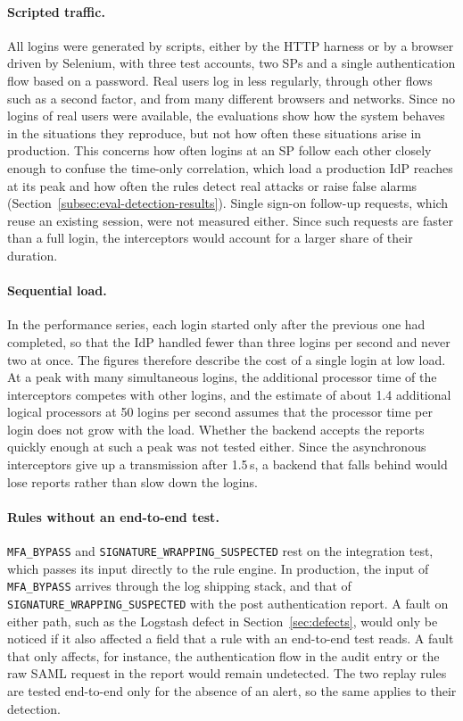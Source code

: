 \documentclass[../main.tex]{subfiles}
\begin{document}
\paragraph{Scripted traffic.}
All logins were generated by scripts, either by the HTTP harness or by a browser driven by Selenium, 
with three test accounts, two SPs and a single authentication flow based on a password. 
Real users log in less regularly, through other flows such as a second factor, and from many 
different browsers and networks. 
Since no logins of real users were available, the evaluations show how the system behaves in the 
situations they reproduce, but not how often these situations arise in production. 
This concerns how often logins at an SP follow each other closely enough to confuse the time-only 
correlation, which load a production IdP reaches at its peak and how often the rules detect real 
attacks or raise false alarms (Section~\ref{subsec:eval-detection-results}). 
Single sign-on follow-up requests, which reuse an existing session, were not measured either. 
Since such requests are faster than a full login, the interceptors would account for a larger share 
of their duration.

\paragraph{Sequential load.}
In the performance series, each login started only after the previous one had completed, so that 
the IdP handled fewer than three logins per second and never two at once. 
The figures therefore describe the cost of a single login at low load. 
At a peak with many simultaneous logins, the additional processor time of the interceptors competes 
with other logins, and the estimate of about 1.4 additional logical processors at 50 logins per second assumes 
that the processor time per login does not grow with the load. 
Whether the backend accepts the reports quickly enough at such a peak was not tested either. 
Since the asynchronous interceptors give up a transmission after 1.5\,s, a backend that falls behind 
would lose reports rather than slow down the logins.

\paragraph{Rules without an end-to-end test.}
\texttt{MFA\_\allowbreak{}BYPASS} and \texttt{SIGNATURE\_\allowbreak{}WRAPPING\_\allowbreak{}SUSPECTED} 
rest on the integration test, which passes its input directly to the rule engine. 
In production, the input of \texttt{MFA\_\allowbreak{}BYPASS} arrives through the log shipping stack, 
and that of \texttt{SIGNATURE\_\allowbreak{}WRAPPING\_\allowbreak{}SUSPECTED} with the post 
authentication report. 
A fault on either path, such as the Logstash defect in Section~\ref{sec:defects}, would only be 
noticed if it also affected a field that a rule with an end-to-end test reads. 
A fault that only affects, for instance, the authentication flow in the audit entry or the raw SAML 
request in the report would remain undetected. 
The two replay rules are tested end-to-end only for the absence of an alert, so the same applies 
to their detection. 
\end{document}
